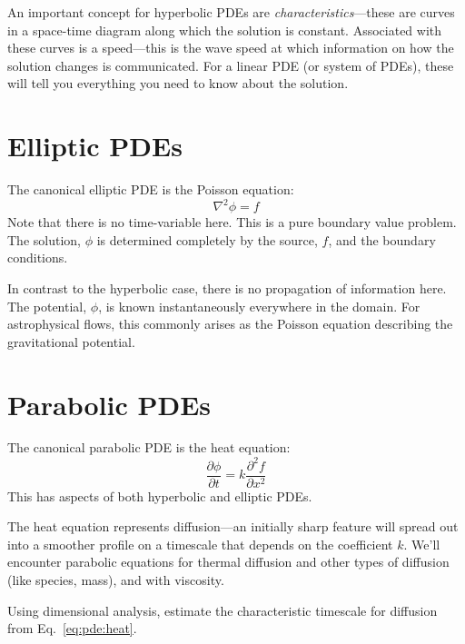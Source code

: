 An important concept for hyperbolic PDEs are {\em
  characteristics}---these are curves in a space-time diagram along
which the solution is constant.  Associated with these curves is a
speed---this is the wave speed at which information on how the
solution changes is communicated.  For a linear PDE (or system of
PDEs), these will tell you everything you need to know about the
solution.


\section{Elliptic PDEs}

The canonical elliptic PDE is the Poisson equation:
\begin{equation}
  \nabla^2 \phi = f
\end{equation}
Note that there is no time-variable here.  This is a pure boundary
value problem.  The solution, $\phi$ is determined completely by the
source, $f$, and the boundary conditions.

In contrast to the hyperbolic case, there is no propagation of
information here.  The potential, $\phi$, is known instantaneously
everywhere in the domain.  For astrophysical flows, this commonly
arises as the Poisson equation describing the gravitational potential.



\section{Parabolic PDEs}

The canonical parabolic PDE is the heat equation:
\begin{equation}
\label{eq:pde:heat}
  \frac{\partial \phi}{\partial t} = k \frac{\partial^2 f}{\partial x^2}
\end{equation}
This has aspects of both hyperbolic and elliptic PDEs.

The heat equation represents diffusion---an initially sharp feature
will spread out into a smoother profile on a timescale that depends on
the coefficient $k$.  We'll encounter parabolic equations for thermal
diffusion and other types of diffusion (like species, mass), and with
viscosity.


\begin{exercise}
{Using dimensional analysis, estimate the characteristic timescale for
  diffusion from Eq.~\ref{eq:pde:heat}.}
\end{exercise}
